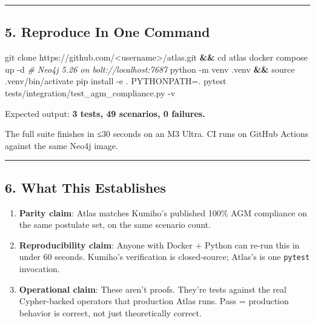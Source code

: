 \documentclass[
]{article}
\newenvironment{Shaded}{}{}
\newcommand{\AttributeTok}[1]{\textcolor[rgb]{0.49,0.56,0.16}{#1}}
\newcommand{\BuiltInTok}[1]{\textcolor[rgb]{0.00,0.50,0.00}{#1}}
\newcommand{\CommentTok}[1]{\textcolor[rgb]{0.38,0.63,0.69}{\textit{#1}}}
\newcommand{\ExtensionTok}[1]{#1}
\newcommand{\FunctionTok}[1]{\textcolor[rgb]{0.02,0.16,0.49}{#1}}
\newcommand{\KeywordTok}[1]{\textcolor[rgb]{0.00,0.44,0.13}{\textbf{#1}}}
\newcommand{\NormalTok}[1]{#1}
\newcommand{\OperatorTok}[1]{\textcolor[rgb]{0.40,0.40,0.40}{#1}}
\newcommand{\VariableTok}[1]{\textcolor[rgb]{0.10,0.09,0.49}{#1}}
\providecommand{\tightlist}{%
  \setlength{\itemsep}{0pt}\setlength{\parskip}{0pt}}
\begin{document}
\begin{center}\rule{0.5\linewidth}{0.5pt}\end{center}

\subsection{5. Reproduce In One Command}\label{reproduce-in-one-command}

\begin{Shaded}
\begin{Highlighting}[]
\FunctionTok{git}\NormalTok{ clone https://github.com/}\OperatorTok{\textless{}}\NormalTok{username}\OperatorTok{\textgreater{}}\NormalTok{/atlas.git }\KeywordTok{\&\&} \BuiltInTok{cd}\NormalTok{ atlas}
\ExtensionTok{docker}\NormalTok{ compose up }\AttributeTok{{-}d}                                \CommentTok{\# Neo4j 5.26 on bolt://localhost:7687}
\ExtensionTok{python} \AttributeTok{{-}m}\NormalTok{ venv .venv }\KeywordTok{\&\&} \BuiltInTok{source}\NormalTok{ .venv/bin/activate}
\ExtensionTok{pip}\NormalTok{ install }\AttributeTok{{-}e}\NormalTok{ .}
\VariableTok{PYTHONPATH}\OperatorTok{=}\NormalTok{. }\ExtensionTok{pytest}\NormalTok{ tests/integration/test\_agm\_compliance.py }\AttributeTok{{-}v}
\end{Highlighting}
\end{Shaded}

Expected output: \textbf{3 tests, 49 scenarios, 0 failures.}

The full suite finishes in ≤30 seconds on an M3 Ultra. CI runs on GitHub
Actions against the same Neo4j image.

\begin{center}\rule{0.5\linewidth}{0.5pt}\end{center}

\subsection{6. What This Establishes}\label{what-this-establishes}

\begin{enumerate}
\def\labelenumi{\arabic{enumi}.}
\tightlist
\item
  \textbf{Parity claim}: Atlas matches Kumiho's published 100\% AGM
  compliance on the same postulate set, on the same scenario count.
\item
  \textbf{Reproducibility claim}: Anyone with Docker + Python can re-run
  this in under 60 seconds. Kumiho's verification is closed-source;
  Atlas's is one \texttt{pytest} invocation.
\item
  \textbf{Operational claim}: These aren't proofs. They're tests against
  the real Cypher-backed operators that production Atlas runs. Pass =
  production behavior is correct, not just theoretically correct.
\end{enumerate}
\end{document}
